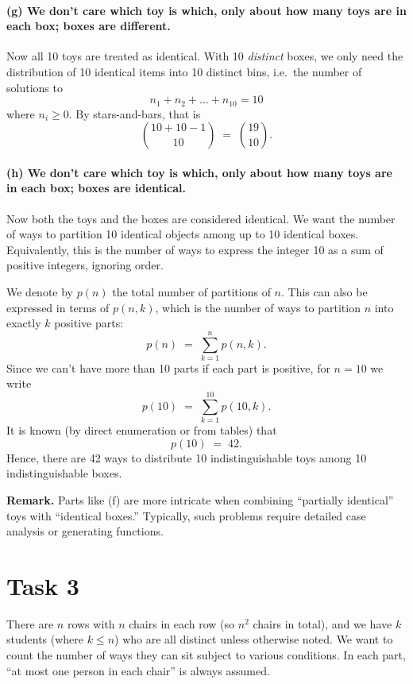 \documentclass[docmute]{article}
\begin{document}
\paragraph{(g) We don’t care which toy is which, only about how many toys are in each box; boxes are different.}
Now all 10 toys are treated as identical. With 10 \emph{distinct} boxes, we only need the distribution of 10 identical items into 10 distinct bins, i.e.\ the number of solutions to
\[
n_1 + n_2 + \dots + n_{10} = 10
\]
where \(n_i \ge 0\). By stars-and-bars, that is
\[
\binom{10 + 10 - 1}{10} \;=\;\binom{19}{10}.
\]

\paragraph{(h) We don’t care which toy is which, only about how many toys are in each box; boxes are identical.}
Now both the toys and the boxes are considered identical. We want the number of ways to partition 10 identical objects among up to 10 identical boxes. Equivalently, this is the number of ways to express the integer 10 as a sum of positive integers, ignoring order. 

We denote by \(p(n)\) the total number of partitions of \(n\). This can also be expressed in terms of \(p(n,k)\), which is the number of ways to partition \(n\) into exactly \(k\) positive parts:
\[
p(n) \;=\; \sum_{k=1}^{n} p(n,k).
\]
Since we can’t have more than 10 parts if each part is positive, for \(n=10\) we write
\[
p(10) 
\;=\;
\sum_{k=1}^{10} p(10,k).
\]
It is known (by direct enumeration or from tables) that
\[
p(10) \;=\; 42.
\]
Hence, there are 42 ways to distribute 10 indistinguishable toys among 10 indistinguishable boxes.

\bigskip
\noindent
\textbf{Remark.} Parts like (f) are more intricate when combining “partially identical” toys with “identical boxes.” Typically, such problems require detailed case analysis or generating functions.

\section{Task 3}

There are \(n\) rows with \(n\) chairs in each row (so \(n^2\) chairs in total), and we have \(k\) students (where \(k \le n\)) who are all distinct unless otherwise noted. We want to count the number of ways they can sit subject to various conditions. In each part, “at most one person in each chair” is always assumed.
\end{document}
